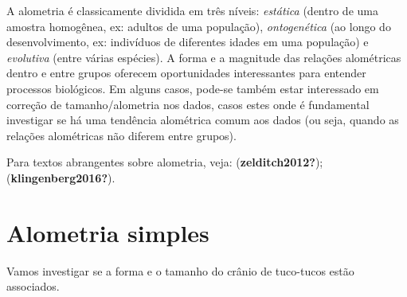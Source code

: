 \documentclass[
]{book}
\begin{document}
A alometria é classicamente dividida em três níveis: \emph{estática} (dentro de uma amostra homogênea, ex: adultos de uma população), \emph{ontogenética} (ao longo do desenvolvimento, ex: indivíduos de diferentes idades em uma população) e \emph{evolutiva} (entre várias espécies). A forma e a magnitude das relações alométricas dentro e entre grupos oferecem oportunidades interessantes para entender processos biológicos. Em alguns casos, pode-se também estar interessado em correção de tamanho/alometria nos dados, casos estes onde é fundamental investigar se há uma tendência alométrica comum aos dados (ou seja, quando as relações alométricas não diferem entre grupos).

Para textos abrangentes sobre alometria, veja: (\textbf{zelditch2012?}); (\textbf{klingenberg2016?}).

\section{Alometria simples}\label{alometria-simples}

Vamos investigar se a forma e o tamanho do crânio de tuco-tucos estão associados.
\end{document}
